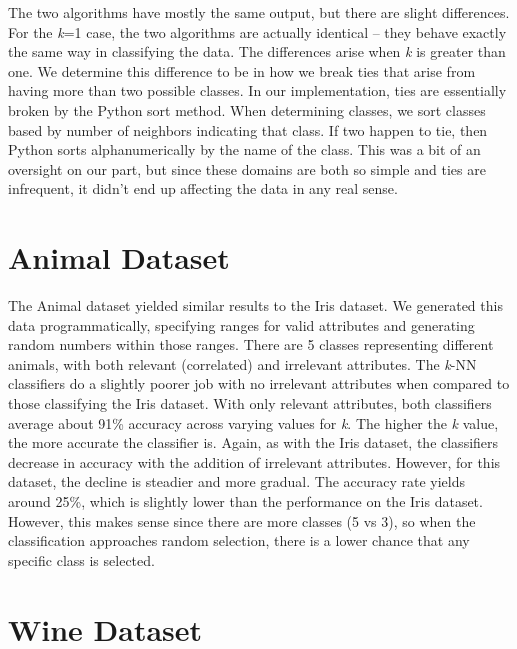 \documentclass{article}
\begin{document}
The two algorithms have mostly the same output, but there are slight differences. For the \textit{k}=1 case, the two algorithms are actually identical -- they behave exactly the same way in classifying the data. The differences arise when \textit{k} is greater than one. We determine this difference to be in how we break ties that arise from having more than two possible classes. In our implementation, ties are essentially broken by the Python sort method. When determining classes, we sort classes based by number of neighbors indicating that class. If two happen to tie, then Python sorts alphanumerically by the name of the class. This was a bit of an oversight on our part, but since these domains are both so simple and ties are infrequent, it didn’t end up affecting the data in any real sense.

\section{Animal Dataset}

The Animal dataset yielded similar results to the Iris dataset. We generated this data programmatically, specifying ranges for valid attributes and generating random numbers within those ranges. There are 5 classes representing different animals, with both relevant (correlated) and irrelevant attributes. The \textit{k}-NN classifiers do a slightly poorer job with no irrelevant attributes when compared to those classifying the Iris dataset. With only relevant attributes, both classifiers average about 91\% accuracy across varying values for \textit{k}. The higher the \textit{k} value, the more accurate the classifier is. Again, as with the Iris dataset, the classifiers decrease in accuracy with the addition of irrelevant attributes. However, for this dataset, the decline is steadier and more gradual. The accuracy rate yields around 25\%, which is slightly lower than the performance on the Iris dataset. However, this makes sense since there are more classes (5 vs 3), so when the classification approaches random selection, there is a lower chance that any specific class is selected.

\section{Wine Dataset}
\end{document}
